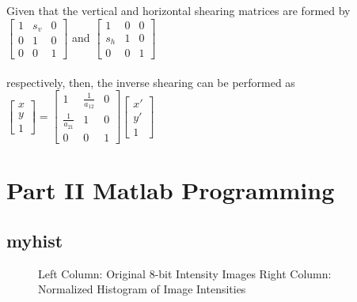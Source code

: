 \documentclass{article}[12 pt]
\begin{document}
Given that the vertical and horizontal shearing matrices are formed by $\begin{bmatrix} 1 & s_v & 0 \\ 0 & 1 & 0 \\ 0 & 0 & 1 \end{bmatrix}$ and $\begin{bmatrix} 1 & 0 & 0 \\ s_h & 1 & 0 \\ 0 & 0 & 1 \end{bmatrix}$ \\ \\ respectively, then, the inverse shearing can be performed as 
$\left[ \begin{array}{c} x \\ y \\ 1 \end{array} \right] = \begin{bmatrix} 1 & \frac{1}{a_{12}} & 0 \\ \frac{1}{a_{21}} & 1 & 0 \\ 0 & 0 & 1 \end{bmatrix} \left[ \begin{array}{c} x' \\ y' \\ 1 \end{array} \right]$

\newpage
\section*{Part II Matlab Programming}

\subsection*{myhist}

\begin{figure}[h!]
\captionsetup[subfloat]{labelformat=empty}
\centering
{}
\hspace{0mm}
\hspace{0mm}
\caption{Left Column: Original 8-bit Intensity Images Right Column: Normalized Histogram of Image Intensities}
\end{figure}
\end{document}
